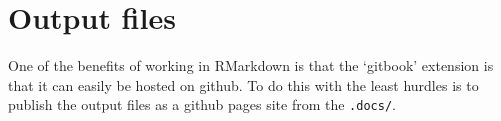 \documentclass[
]{book}
\begin{document}
\hypertarget{output-files}{%
\section{Output files}\label{output-files}}

One of the benefits of working in RMarkdown is that the `gitbook' extension is that it can easily be hosted on github. To do this with the least hurdles is to publish the output files as a github pages site from the \texttt{.docs/}.

  
\end{document}
